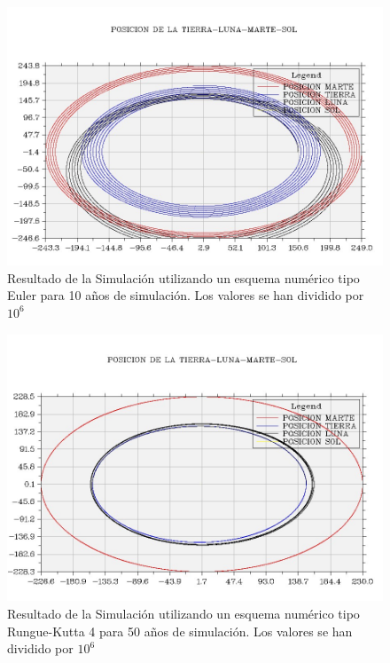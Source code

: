 \documentclass[11pt,singlespacing,liststotoc,headsepline,a4paper]{article}
\begin{document}
\begin{figure}[H]
	\centering
	\includegraphics[width=1\textwidth]{TLMS10A_EU.jpg}
	\caption{Resultado de la Simulación utilizando un esquema numérico tipo Euler para 10 años de simulación.  Los valores se han dividido por $10^{6}$}
	\label{TLMS10A_EU}
\end{figure}


\begin{figure}[H]
	\centering
	\includegraphics[width=1\textwidth]{TLMS50A_RG4.jpg}
	\caption{Resultado de la Simulación utilizando un esquema numérico tipo Rungue-Kutta 4 para 50 años de simulación.  Los valores se han dividido por $10^{6}$}
	\label{TLMS50A_RG4}
\end{figure}
\end{document}
